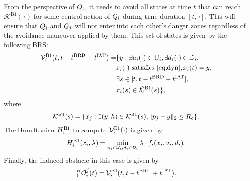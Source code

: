 \begin{itemize}[leftmargin=*]
From the perspective of $Q_i$, it needs to avoid all states at time $t$ that can reach $\mathcal{K}^{\text{B1}}(\tau)$ for some control action of $Q_i$ during time duration $[t, \tau]$. This will ensure that $Q_i$ and $Q_j$ will not enter into each other's danger zones regardless of the avoidance maneuver applied by them. This set of states is given by the following BRS:
\begin{equation}  \label{eq:ObsBRS_case1_caseB}
\begin{aligned}
\brs^{\text{B1}}_{i}(t, t-\brd+\iat) = & \{y: \exists \ctrl_i(\cdot) \in \cfset_i, \exists \dstb_i(\cdot) \in \dfset_i, \\
& \state_i(\cdot) \text{ satisfies \eqref{eq:dyn}}, \state_i(t) = y, \\
& \exists s \in [t, t-\brd+\iat],\\
& \state_i(s) \in \tilde{\mathcal{K}}^{\text{B1}}(s)\},
\end{aligned}
\end{equation}
where
\begin{equation*}
\tilde{\mathcal{K}}^{\text{B1}}(s) = \{x_j: \exists (y, h) \in \mathcal{K}^{\text{B1}}(s), \|p_j - y\|_2 \le R_c \}.
\end{equation*} 
The Hamiltonian $H^{\text{B1}}_{i}$ to compute $\mathcal{V}^{\text{B1}}_{i}(\cdot)$ is given by
\begin{equation} \label{eqn:BRS_obsham_case1_caseB}
\ham^{\text{B1}}_{i}(\state_i, \costate) = \min_{\ctrl_i \in \cset_i, \dstb_i \in \dset_i} \costate \cdot f_i (\state_i, \ctrl_i, \dstb_i).
\end{equation}
Finally, the induced obstacle in this case is given by
\begin{equation} \label{eq:intruderObs_case1_caseB} 
_1^B\ioset_i^j(t) = \brs^{\text{B1}}_{i}(t, t-\brd+\iat).
\end{equation}
\end{itemize}